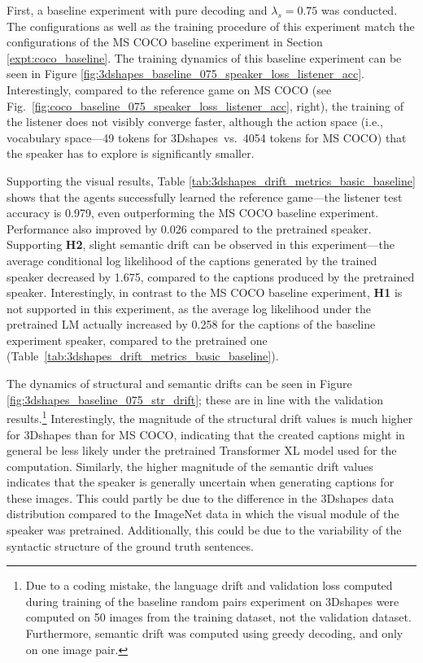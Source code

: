 First, a baseline experiment with pure decoding and $\lambda_s = 0.75$ was conducted.
The configurations as well as the training procedure of this experiment match the configurations of the MS COCO baseline experiment in Section \ref{expt:coco_baseline}. The training dynamics of this baseline experiment can be seen in Figure \ref{fig:3dshapes_baseline_075_speaker_loss_listener_acc}. Interestingly, compared to the reference game on MS COCO (see Fig.~\ref{fig:coco_baseline_075_speaker_loss_listener_acc}, right), the training of the listener does not visibly converge faster, although the action space (i.e., vocabulary space---49 tokens for 3Dshapes~vs.~4054 tokens for MS COCO) that the speaker has to explore is significantly smaller. 
 
Supporting the visual results, Table \ref{tab:3dshapes_drift_metrics_basic_baseline} shows that the agents successfully learned the reference game---the listener test accuracy is 0.979, even outperforming the MS COCO baseline experiment. Performance also improved by 0.026 compared to the pretrained speaker. 
Supporting \textbf{H2}, slight semantic drift can be observed in this experiment---the average conditional log likelihood of the captions generated by the trained speaker decreased by 1.675, compared to the captions produced by the pretrained speaker. Interestingly, in contrast to the MS COCO baseline experiment, \textbf{H1} is not supported in this experiment, as the average log likelihood under the pretrained LM actually increased by 0.258 for the captions of the baseline experiment speaker, compared to the pretrained one (Table~\ref{tab:3dshapes_drift_metrics_basic_baseline}).
 
The dynamics of structural and semantic drifts can be seen in Figure \ref{fig:3dshapes_baseline_075_str_drift}; these are in line with the validation results.\footnote{Due to a coding mistake, the language drift and validation loss computed during training of the baseline random pairs experiment on 3Dshapes were computed on 50 images from the training dataset, not the validation dataset. Furthermore, semantic drift was computed using greedy decoding, and only on one image pair.} 
Interestingly, the magnitude of the structural drift values is much higher for 3Dshapes than for MS COCO, indicating that the created captions might in general be less likely under the pretrained Transformer XL model used for the computation. Similarly, the higher magnitude of the semantic drift values indicates that the speaker is generally uncertain when generating captions for these images. This could partly be due to the difference in the 3Dshapes data distribution compared to the ImageNet data in which the visual module of the speaker was pretrained. Additionally, this could be due to the variability of the syntactic structure of the ground truth sentences. 

